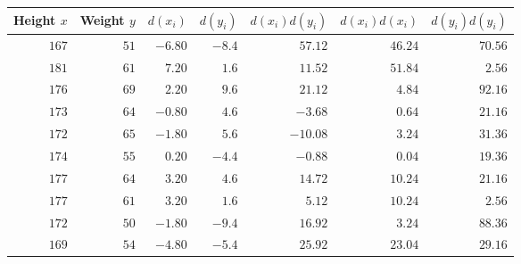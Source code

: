 \begin{tabular}{rrrrrrr}                                                               \toprule
Height $x$ & Weight $y$ & $d(x_i)$ & $d(y_i)$ & $d(x_i)d(y_i)$ & $d(x_i)d(x_i)$ & $d(y_i)d(y_i)$ \\\midrule
$167$      & $51$       & $-6.80$  & $-8.4$   & $57.12$        & $46.24$        & $70.56$        \\[4pt]
$181$      & $61$       & $7.20$   & $1.6$    & $11.52$        & $51.84$        & $2.56$         \\[4pt]
$176$      & $69$       & $2.20$   & $9.6$    & $21.12$        & $4.84$         & $92.16$        \\[4pt]
$173$      & $64$       & $-0.80$  & $4.6$    & $-3.68$        & $0.64$         & $21.16$        \\[4pt]
$172$      & $65$       & $-1.80$  & $5.6$    & $-10.08$       & $3.24$         & $31.36$        \\[4pt]
$174$      & $55$       & $0.20$   & $-4.4$   & $-0.88$        & $0.04$         & $19.36$        \\[4pt]
$177$      & $64$       & $3.20$   & $4.6$    & $14.72$        & $10.24$        & $21.16$        \\[4pt]
$177$      & $61$       & $3.20$   & $1.6$    & $5.12$         & $10.24$        & $2.56$         \\[4pt]
$172$      & $50$       & $-1.80$  & $-9.4$   & $16.92$        & $3.24$         & $88.36$        \\[4pt]
$169$      & $54$       & $-4.80$  & $-5.4$   & $25.92$        & $23.04$        & $29.16$        \\\bottomrule
\end{tabular}
